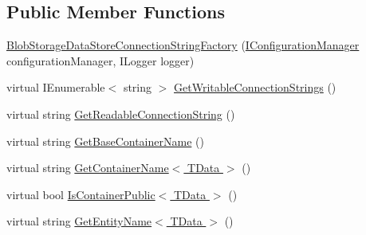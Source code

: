 \subsection*{Public Member Functions}
\begin{DoxyCompactItemize}
\item 
\hyperlink{classCqrs_1_1Azure_1_1BlobStorage_1_1DataStores_1_1BlobStorageDataStoreConnectionStringFactory_ade6a85d6f80fd8cd53c2853ee103de9d_ade6a85d6f80fd8cd53c2853ee103de9d}{Blob\+Storage\+Data\+Store\+Connection\+String\+Factory} (\hyperlink{interfaceCqrs_1_1Configuration_1_1IConfigurationManager}{I\+Configuration\+Manager} configuration\+Manager, I\+Logger logger)
\item 
virtual I\+Enumerable$<$ string $>$ \hyperlink{classCqrs_1_1Azure_1_1BlobStorage_1_1DataStores_1_1BlobStorageDataStoreConnectionStringFactory_a71b549351646fd4261b3f52f264759f4_a71b549351646fd4261b3f52f264759f4}{Get\+Writable\+Connection\+Strings} ()
\item 
virtual string \hyperlink{classCqrs_1_1Azure_1_1BlobStorage_1_1DataStores_1_1BlobStorageDataStoreConnectionStringFactory_a1b5b69109d07e5612df981012d812e78_a1b5b69109d07e5612df981012d812e78}{Get\+Readable\+Connection\+String} ()
\item 
virtual string \hyperlink{classCqrs_1_1Azure_1_1BlobStorage_1_1DataStores_1_1BlobStorageDataStoreConnectionStringFactory_af9d95c58f5f275d9c9c1575b3d147bdb_af9d95c58f5f275d9c9c1575b3d147bdb}{Get\+Base\+Container\+Name} ()
\item 
virtual string \hyperlink{classCqrs_1_1Azure_1_1BlobStorage_1_1DataStores_1_1BlobStorageDataStoreConnectionStringFactory_a20374b5e2e77a593da164d3eb42b2a0a_a20374b5e2e77a593da164d3eb42b2a0a}{Get\+Container\+Name$<$ T\+Data $>$} ()
\item 
virtual bool \hyperlink{classCqrs_1_1Azure_1_1BlobStorage_1_1DataStores_1_1BlobStorageDataStoreConnectionStringFactory_a96e368a2b00f9614eff6ca4bcdeb3a24_a96e368a2b00f9614eff6ca4bcdeb3a24}{Is\+Container\+Public$<$ T\+Data $>$} ()
\item 
virtual string \hyperlink{classCqrs_1_1Azure_1_1BlobStorage_1_1DataStores_1_1BlobStorageDataStoreConnectionStringFactory_a0ece7f48e0305b8397b95308dfdf2532_a0ece7f48e0305b8397b95308dfdf2532}{Get\+Entity\+Name$<$ T\+Data $>$} ()
\end{DoxyCompactItemize}
